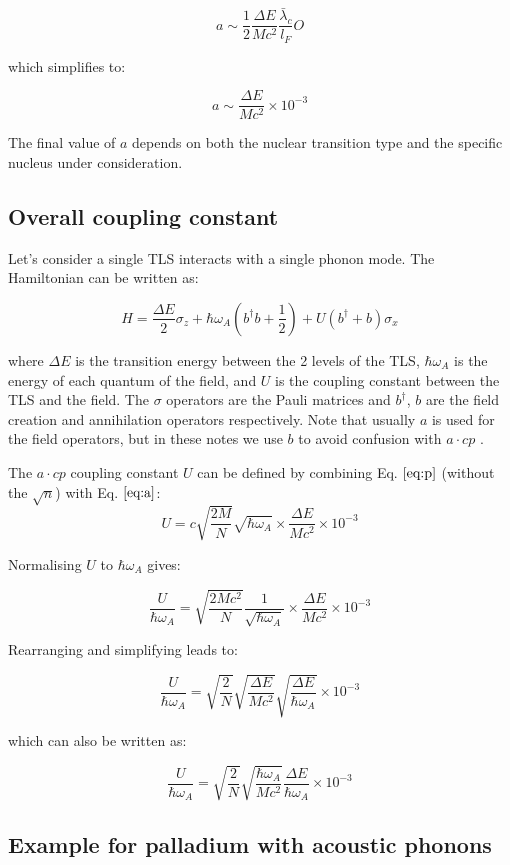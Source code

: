 \documentclass[
]{article}
\renewcommand{\[}{\begin{equation}}
\renewcommand{\]}{\end{equation}}
\begin{document}
\[
a \sim \frac{1}{2} \frac{\Delta E}{M c^2} \frac{\bar\lambda_c}{l_F} O 
\]

which simplifies to:

\[
a \sim \frac{\Delta E}{M c^2} \times 10^{-3} 
\label{eq:a}
\]

The final value of \(a\) depends on both the nuclear transition type and
the specific nucleus under consideration.

\subsection{Overall coupling constant}\label{overall-coupling-constant}

Let's consider a single TLS interacts with a single phonon mode. The
Hamiltonian can be written as:

\[
H = \frac{\Delta E}{2} \sigma_z + \hbar\omega_A\left(b^{\dagger}b +\frac{1}{2}\right) + U\left( b^{\dagger} + b \right)\sigma_x
\]

where \(\Delta E\) is the transition energy between the 2 levels of the
TLS, \(\hbar\omega_A\) is the energy of each quantum of the field, and
\(U\) is the coupling constant between the TLS and the field. The
\(\sigma\) operators are the Pauli matrices and \(b^{\dagger}\), \(b\)
are the field creation and annihilation operators respectively. Note
that usually \(a\) is used for the field operators, but in these notes
we use \(b\) to avoid confusion with \(a \cdot cp\) .

The \(a \cdot cp\) coupling constant \(U\) can be defined by combining
Eq. \(\ref{eq:p}\) (without the \(\sqrt{n}\)) with Eq. \(\ref{eq:a}\):
\[
U = c \sqrt{\frac{2M}{N}} \sqrt{\hbar \omega_A} \times \frac{\Delta E}{M c^2} \times 10^{-3}
\]

Normalising \(U\) to \(\hbar \omega_A\) gives:

\[
\frac{U}{\hbar \omega_A} = \sqrt{\frac{2M c^2}{N}} \frac{1}{\sqrt{\hbar \omega_A}} \times \frac{\Delta E}{M c^2} \times 10^{-3}
\]

Rearranging and simplifying leads to:

\[
\frac{U}{\hbar \omega_A} = \sqrt{\frac{2}{N}} \sqrt{\frac{\Delta E}{M c^2}} \sqrt{\frac{\Delta E}{\hbar \omega_A}} \times 10^{-3}
\]

which can also be written as:

\[
\frac{U}{\hbar \omega_A} = \sqrt{\frac{2}{N}} \sqrt{\frac{\hbar \omega_A}{M c^2}} \frac{\Delta E}{\hbar \omega_A} \times 10^{-3}
\]

\subsection{Example for palladium with acoustic
phonons}\label{example-for-palladium-with-acoustic-phonons}
\end{document}
